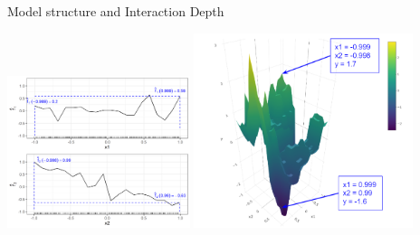 \begin{vbframe}{Model structure and Interaction Depth}
\begin{center}
\includegraphics[width=0.4\textwidth]{figure_man/boosting_interaction_example_ID2.PNG}
\includegraphics[width=0.48\textwidth]{figure/interaction_td2_d3.png}
\end{center}


\end{vbframe}
